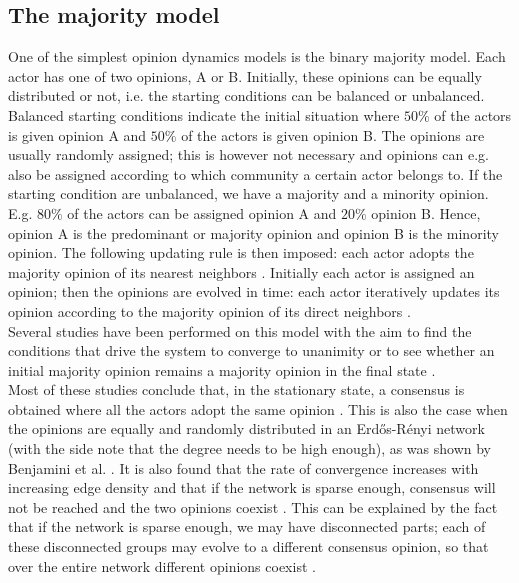 \documentclass[11 pt , letterpaper , twoside , openright]{book}
\begin{document}
\subsection{The majority model}\label{majModel}

One of the simplest opinion dynamics models is the binary majority model. Each actor has one of two opinions, A or B. Initially, these opinions can be equally distributed or not, i.e. the starting conditions can be balanced or unbalanced. Balanced starting conditions indicate the initial situation where $50 \%$ of the actors is given opinion A and $50 \%$ of the actors is given opinion B. The opinions are usually randomly assigned; this is however not necessary and opinions can e.g. also be assigned according to which community a certain actor belongs to. If the starting condition are unbalanced, we have a majority and a minority opinion. E.g. $80 \%$ of the actors can be assigned opinion A and $20 \%$ opinion B. Hence, opinion A is the predominant or majority opinion and opinion B is the minority opinion. The following updating rule is then imposed: each actor adopts the majority opinion of its nearest neighbors \cite{Nguyen2020}. Initially each actor is assigned an opinion; then the opinions are evolved in time: each actor iteratively updates its opinion according to the majority opinion of its direct neighbors \cite{Nguyen2020}.\\
\newline
Several studies have been performed on this model with the aim to find the conditions that drive the system to converge to unanimity or to see whether an initial majority opinion remains a majority opinion in the final state \cite{Nguyen2020}.\\
\newline
Most of these studies conclude that, in the stationary state, a consensus is obtained where all the actors adopt the same opinion \cite{Nguyen2020}. This is also the case when the opinions are equally and randomly distributed in an Erd\H{o}s-R\'{e}nyi network (with the side note that the degree needs to be high enough), as was shown by Benjamini et al. \cite{Benjamini2016}. It is also found that the rate of convergence increases with increasing edge density and that if the network is sparse enough, consensus will not be reached and the two opinions coexist \cite{Nguyen2020}. This can be explained by the fact that if the network is sparse enough, we may have disconnected parts; each of these disconnected groups may evolve to a different consensus opinion, so that over the entire network different opinions coexist \cite{Nguyen2020}.
\end{document}
